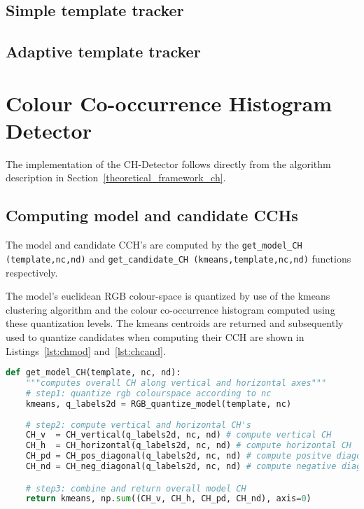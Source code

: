 \subsection{Simple template tracker}

\subsection{Adaptive template tracker}


\section{Colour Co-occurrence Histogram Detector}\label{implementation_ch}
The implementation of the CH-Detector follows directly from the algorithm
description in Section~\ref{theoretical_framework_ch}.

\subsection{Computing model and candidate CCHs}
The model and candidate CCH's are computed by the \lstinline{get_model_CH (template,nc,nd)} 
and \lstinline{get_candidate_CH (kmeans,template,nc,nd)}
functions respectively.

The model's euclidean RGB colour-space is quantized by use of the kmeans
clustering algorithm and the colour co-occurrence histogram computed using these
quantization levels. The kmeans centroids are returned and subsequently used to
quantize candidates when computing their CCH are shown in
Listings~\ref{lst:chmod} and~\ref{lst:chcand}.

\begin{lstlisting}[language=Python, caption={Computing model CH}, captionpos=b, label={lst:chmod}]
def get_model_CH(template, nc, nd):
    """computes overall CH along vertical and horizontal axes"""
    # step1: quantize rgb colourspace according to nc
    kmeans, q_labels2d = RGB_quantize_model(template, nc)
    
    # step2: compute vertical and horizontal CH's
    CH_v  = CH_vertical(q_labels2d, nc, nd) # compute vertical CH
    CH_h  = CH_horizontal(q_labels2d, nc, nd) # compute horizontal CH
    CH_pd = CH_pos_diagonal(q_labels2d, nc, nd) # compute positve diagonal CH
    CH_nd = CH_neg_diagonal(q_labels2d, nc, nd) # compute negative diagonal CH

    # step3: combine and return overall model CH
    return kmeans, np.sum((CH_v, CH_h, CH_pd, CH_nd), axis=0)
\end{lstlisting}

